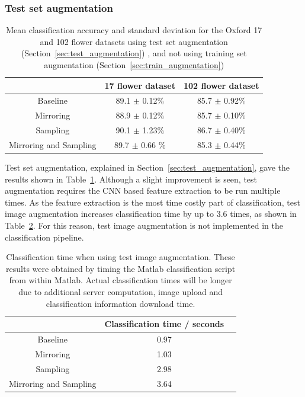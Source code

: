 \documentclass[11pt, a4paper]{report}
\begin{document}
\subsubsection{Test set augmentation}

\begin{table}[h]
\centering 
\renewcommand{\arraystretch}{1.3}
\begin{tabular}{c|cc}
  & {\bf 17 flower dataset} & {\bf 102 flower dataset} \\
  \hline
  Baseline & 89.1 $\pm$ 0.12\% & 85.7 $\pm$ 0.92\% \\
  Mirroring & 88.9 $\pm$ 0.12\% & 85.7 $\pm$ 0.10\% \\
  Sampling & 90.1 $\pm$ 1.23\% & 86.7 $\pm$ 0.40\% \\
  Mirroring and Sampling & 89.7 $\pm$ 0.66 \% & 85.3 $\pm$ 0.44\% 
\end{tabular}
\renewcommand{\arraystretch}{1}
\caption{Mean classification accuracy and standard deviation for the Oxford 17 and 102 flower datasets using test set augmentation (Section~\ref{sec:test_augmentation})	, and not using training set augmentation (Section~\ref{sec:train_augmentation})}
\label{table:test_augmentation}
\end{table}


Test set augmentation, explained in Section~\ref{sec:test_augmentation}, gave the results shown in Table~\ref{table:test_augmentation}. Although a slight improvement is seen, test augmentation requires the CNN based feature extraction to be run multiple times. As the feature extraction is the most time costly part of classification, test image augmentation increases classification time by up to 3.6 times, as shown in Table~\ref{table:classification_time}. For this reason, test image augmentation is not implemented in the classification pipeline.



\begin{table}[h]
\centering 
\renewcommand{\arraystretch}{1.3}
\begin{tabular}{c|cc}
  & {\bf Classification time / seconds} \\
  \hline
  Baseline & 0.97 \\
  Mirroring &  1.03 \\
  Sampling & 2.98  \\
  Mirroring and Sampling & 3.64
\end{tabular}
\renewcommand{\arraystretch}{1}
\caption{ Classification time when using test image augmentation. These results were obtained by timing the Matlab classification script from within Matlab. Actual classification times will be longer due to additional server computation, image upload and classification information download time. }
\label{table:classification_time}
\end{table}
\end{document}
